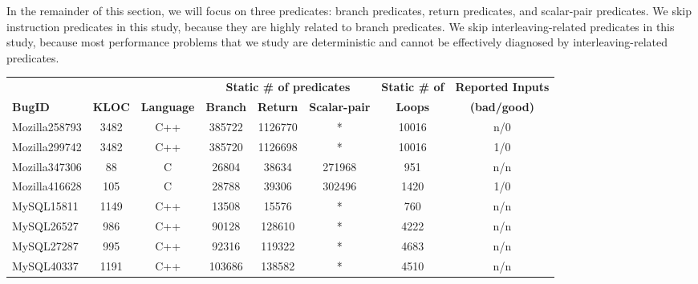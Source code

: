 In the remainder of this section, we will focus on three predicates: branch
predicates, return predicates, and scalar-pair predicates. We skip
instruction predicates in this study, because they are highly related to
branch predicates. We skip interleaving-related predicates in this study,
because most performance problems that we study are deterministic and
cannot be effectively diagnosed by interleaving-related 
predicates.

\begin{table*}
  \centering
  \scriptsize
  \newcommand{\Yes}[1]{\checkmark{}$_#1$}
  \newcommand{\No}[0]{-}
  \begin{adjustwidth}{-.15in}{-.15in}
  {
  \begin{tabular}{lccccccc}
    \toprule
              &          &         & \multicolumn{3}{c}{\bf Static \# of predicates}& {\bf Static \# of} & {\bf Reported Inputs}\\
    \cmidrule(lr){4-6}
     {\bf BugID}     &{\bf KLOC}   &{\bf Language}    &{\bf Branch}    &{\bf Return}   &{\bf Scalar-pair}   &{\bf Loops}    &{\bf (bad/good)} \\
    \midrule
    Mozilla258793    & 3482        & C++              & 385722         & 1126770       & *                & 10016         & n/0            \\
    Mozilla299742    & 3482        & C++              & 385720         & 1126698       & *                & 10016         & 1/0            \\
    Mozilla347306    & 88          & C                & 26804          & 38634         & 271968             & 951           & n/n            \\
    Mozilla416628    & 105         & C                & 28788          & 39306         & 302496             & 1420          & 1/0            \\
    \midrule
    MySQL15811       & 1149        & C++              & 13508          & 15576         & *                & 760           & n/n            \\
    MySQL26527       & 986         & C++              & 90128          & 128610        & *                & 4222          & n/n            \\
    MySQL27287       & 995         & C++              & 92316          & 119322        & *                & 4683          & n/n            \\
    MySQL40337       & 1191        & C++              & 103686         & 138582        & *                & 4510          & n/n            \\

\end{tabular}}
\end{adjustwidth}
\end{table*}
